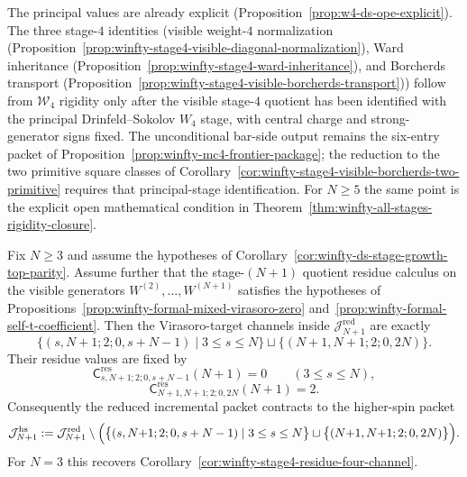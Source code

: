 \begin{remark}
The principal values are already explicit
(Proposition~\ref{prop:w4-ds-ope-explicit}). The three stage-$4$
identities (visible weight-$4$ normalization
(Proposition~\ref{prop:winfty-stage4-visible-diagonal-normalization}),
Ward inheritance
(Proposition~\ref{prop:winfty-stage4-ward-inheritance}), and
Borcherds transport
(Proposition~\ref{prop:winfty-stage4-visible-borcherds-transport})) follow
from $\mathcal{W}_4$ rigidity only after the visible stage-$4$ quotient
has been identified with the principal Drinfeld--Sokolov $W_4$ stage,
with central charge and strong-generator signs fixed. The unconditional
bar-side output remains the six-entry packet of
Proposition~\ref{prop:winfty-mc4-frontier-package}; the reduction to
the two primitive square classes of
Corollary~\ref{cor:winfty-stage4-visible-borcherds-two-primitive}
requires that principal-stage identification. For $N\geq5$ the same
point is the explicit open mathematical condition in
Theorem~\ref{thm:winfty-all-stages-rigidity-closure}.
\end{remark}

\begin{proposition}
\label{prop:winfty-stage-growth-virasoro-target-contraction}
Fix $N \ge 3$ and assume the hypotheses of
Corollary~\ref{cor:winfty-ds-stage-growth-top-parity}. Assume
further that the stage-$(N+1)$ quotient residue calculus on the
visible generators
$W^{(2)},\dots,W^{(N+1)}$ satisfies the hypotheses of
Propositions~\ref{prop:winfty-formal-mixed-virasoro-zero}
and~\ref{prop:winfty-formal-self-t-coefficient}. Then the
Virasoro-target channels inside
$\mathcal{J}_{N+1}^{\mathrm{red}}$ are exactly
\[
\bigl\{
(s,N{+}1;2;0,s+N-1)\mid 3\le s\le N
\bigr\}
\sqcup
\bigl\{
(N{+}1,N{+}1;2;0,2N)
\bigr\}.
\]
Their residue values are fixed by
\[
\mathsf{C}^{\mathrm{res}}_{s,N+1;2;0,s+N-1}(N+1)=0
\qquad (3\le s\le N),
\]
\[
\mathsf{C}^{\mathrm{res}}_{N+1,N+1;2;0,2N}(N+1)=2.
\]
Consequently the reduced incremental packet contracts to the
higher-spin packet
\[
\mathcal{J}_{N+1}^{\mathrm{hs}}
:=
\mathcal{J}_{N+1}^{\mathrm{red}}
\setminus
\Bigl(
\bigl\{
(s,N{+}1;2;0,s+N-1)\mid 3\le s\le N
\bigr\}
\sqcup
\bigl\{
(N{+}1,N{+}1;2;0,2N)
\bigr\}
\Bigr).
\]
For $N=3$ this recovers
Corollary~\ref{cor:winfty-stage4-residue-four-channel}.
\end{proposition}

